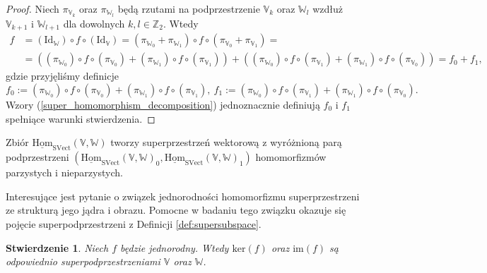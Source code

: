 \documentclass[11pt,a4paper]{report}
\newtheorem{proposition}[theorem]{Stwierdzenie}
\theoremstyle{definition}
\begin{document}
\begin{proof} Niech $\pi_{\mathbb{V}_k}$ oraz $\pi_{\mathbb{W}_l}$ będą rzutami na podprzestrzenie $\mathbb{V}_k$ oraz $\mathbb{W}_l$ wzdłuż $\mathbb{V}_{k+1}$ i $\mathbb{W}_{l+1}$ dla dowolnych $k,l \in \mathbb{Z}_2$. Wtedy
	\begin{equation*} 
		\begin{aligned}
			f & = (\textrm{Id}_\mathbb{W}) \!\circ\! f \!\circ \!(\textrm{Id}_\mathbb{V}) = (\pi_{\mathbb{W}_0} + \pi_{\mathbb{W}_1}) \!\circ\! f \!\circ \! (\pi_{\mathbb{V}_0} + \pi_{\mathbb{V}_1}) =                                                                                                     \\
			  & = ((\pi_{\mathbb{W}_0}) \!\circ\! f \!\circ \! (\pi_{\mathbb{V}_0}) + (\pi_{\mathbb{W}_1}) \!\circ\! f \!\circ \! (\pi_{\mathbb{V}_1})) + ((\pi_{\mathbb{W}_0}) \!\circ\! f \!\circ \! (\pi_{\mathbb{V}_1}) + (\pi_{\mathbb{W}_1}) \!\circ\! f \!\circ \! (\pi_{\mathbb{V}_0})) = f_0 + f_1, 
		\end{aligned}
	\end{equation*}
	gdzie przyjęliśmy definicje 
	\begin{equation}
		\label{super_homomorphism_decomposition}
		f_0 := (\pi_{\mathbb{W}_0}) \!\circ\! f \!\circ \! (\pi_{\mathbb{V}_0}) + (\pi_{\mathbb{W}_1}) \!\circ\! f \!\circ \! (\pi_{\mathbb{V}_1}),\ f_1 := (\pi_{\mathbb{W}_0}) \!\circ\! f \!\circ \! (\pi_{\mathbb{V}_1}) + (\pi_{\mathbb{W}_1}) \!\circ\! f \!\circ \! (\pi_{\mathbb{V}_0}).
	\end{equation}
	Wzory (\ref{super_homomorphism_decomposition}) jednoznacznie definiują $f_0$ i $f_1$ spełniące warunki stwierdzenia.
\end{proof}

Zbiór $\underline{\mathrm{Hom}}_{\mathrm{SVect}}(\mathbb{V},\mathbb{W})$ tworzy superprzestrzeń wektorową z wyróżnioną parą podprzestrzeni $(\underline{\mathrm{Hom}}_{\mathrm{SVect}}(\mathbb{V},\mathbb{W})_0,\underline{\mathrm{Hom}}_{\mathrm{SVect}}(\mathbb{V},\mathbb{W})_1)$ homomorfizmów parzystych i nieparzystych.

Interesujące jest pytanie o związek jednorodności homomorfizmu superprzestrzeni ze strukturą jego jądra i obrazu. Pomocne w badaniu tego związku okazuje się pojęcie superpodprzestrzeni z Definicji \ref{def:supersubspace}.

\begin{proposition}
	\label{homogeneous_morphism_decomposition}
	Niech $f$ będzie jednorodny. Wtedy $\textrm{ker}(f)$ oraz $\textrm{im}(f)$ są odpowiednio superpodprzestrzeniami $\mathbb{V}$ oraz $\mathbb{W}$.
\end{proposition}
\end{document}
